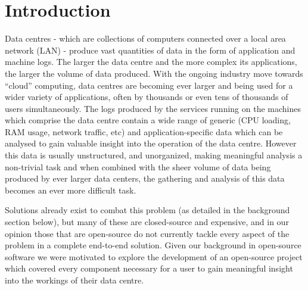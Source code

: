\section{Introduction}

Data centres - which are collections of computers connected over a local area
network (LAN) - produce vast quantities of data in the form of application and
machine logs. The larger the data centre and the more complex its applications,
the larger the volume of data produced. With the ongoing industry move towards
“cloud” computing, data centres are becoming ever larger and being used for a
wider variety of applications, often by thousands or even tens of thousands of
users simultaneously. The logs produced by the services running on the machines
which comprise the data centre contain a wide range of generic (CPU loading,
RAM usage, network traffic, etc) and application-specific data which can be
analysed to gain valuable insight into the operation of the data centre.
However this data is usually unstructured, and unorganized, making meaningful
analysis a non-trivial task and when combined with the sheer volume of  data
being produced by ever larger data centers, the gathering and analysis of this
data becomes an ever more difficult task.

Solutions already exist to combat this problem (as detailed in the background
section below), but many of these are closed-source and expensive, and in our
opinion those that are open-source do not currently tackle every aspect of the
problem in a complete end-to-end solution. Given our background in open-source
software we were motivated to explore the development of an open-source project
which covered every component necessary for a user to gain meaningful insight
into the workings of their data centre.
